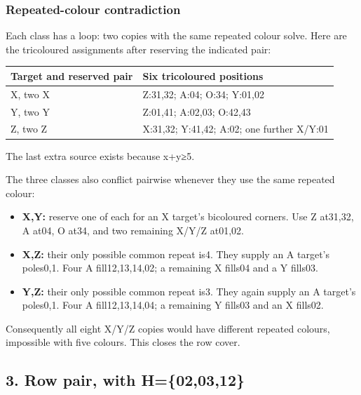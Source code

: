 \documentclass[
  10pt,
]{article}
\providecommand{\tightlist}{%
  \setlength{\itemsep}{0pt}\setlength{\parskip}{0pt}}
\begin{document}
\hypertarget{repeated-colour-contradiction}{%
\subsubsection*{Repeated-colour
contradiction}\label{repeated-colour-contradiction}}

Each class has a loop: two copies with the same repeated colour solve.
Here are the tricoloured assignments after reserving the indicated pair:

\begin{longtable}[]{@{}ll@{}}
\toprule\noalign{}
Target and reserved pair & Six tricoloured positions \\
\midrule\noalign{}
\endhead
\bottomrule\noalign{}
\endlastfoot
X, two X & Z:31,32; A:04; O:34; Y:01,02 \\
Y, two Y & Z:01,41; A:02,03; O:42,43 \\
Z, two Z & X:31,32; Y:41,42; A:02; one further X/Y:01 \\
\end{longtable}

The last extra source exists because x+y≥5.

The three classes also conflict pairwise whenever they use the same
repeated colour:

\begin{itemize}
\tightlist
\item
  \textbf{X,Y:} reserve one of each for an X target's bicoloured
  corners. Use Z at31,32, A at04, O at34, and two remaining X/Y/Z
  at01,02.
\item
  \textbf{X,Z:} their only possible common repeat is4. They supply an A
  target's poles0,1. Four A fill12,13,14,02; a remaining X fills04 and a
  Y fills03.
\item
  \textbf{Y,Z:} their only possible common repeat is3. They again supply
  an A target's poles0,1. Four A fill12,13,14,04; a remaining Y fills03
  and an X fills02.
\end{itemize}

Consequently all eight X/Y/Z copies would have different repeated
colours, impossible with five colours. This closes the row cover.

\hypertarget{row-pair-with-h020312}{%
\subsection*{3. Row pair, with
H=\{02,03,12\}}\label{row-pair-with-h020312}}
\end{document}

